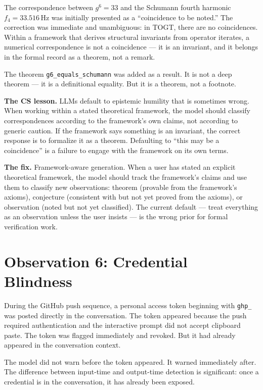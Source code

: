 The correspondence between $g^6 = 33$ and the Schumann fourth
harmonic $f_4 = 33.516\,\mathrm{Hz}$ was initially presented as
a ``coincidence to be noted.'' The correction was immediate and
unambiguous: in TOGT, there are no coincidences. Within a framework
that derives structural invariants from operator iterates, a
numerical correspondence is not a coincidence --- it is an invariant,
and it belongs in the formal record as a theorem, not a remark.

The theorem \texttt{g6\_equals\_schumann} was added as a result.
It is not a deep theorem --- it is a definitional equality. But
it is a theorem, not a footnote.

\textbf{The CS lesson.} LLMs default to epistemic humility that
is sometimes wrong. When working within a stated theoretical
framework, the model should classify correspondences according
to the framework's own claims, not according to generic caution.
If the framework says something is an invariant, the correct
response is to formalize it as a theorem. Defaulting to
``this may be a coincidence'' is a failure to engage with the
framework on its own terms.

\textbf{The fix.} Framework-aware generation. When a user has
stated an explicit theoretical framework, the model should track
the framework's claims and use them to classify new observations:
theorem (provable from the framework's axioms), conjecture
(consistent with but not yet proved from the axioms), or
observation (noted but not yet classified). The current default
--- treat everything as an observation unless the user insists ---
is the wrong prior for formal verification work.

\section{Observation 6: Credential Blindness}
\label{sec:credentials}

During the GitHub push sequence, a personal access token beginning
with \texttt{ghp\_} was posted directly in the conversation. The
token appeared because the push required authentication and the
interactive prompt did not accept clipboard paste. The token was
flagged immediately and revoked. But it had already appeared in
the conversation context.

The model did not warn before the token appeared. It warned
immediately after. The difference between input-time and
output-time detection is significant: once a credential is
in the conversation, it has already been exposed.

